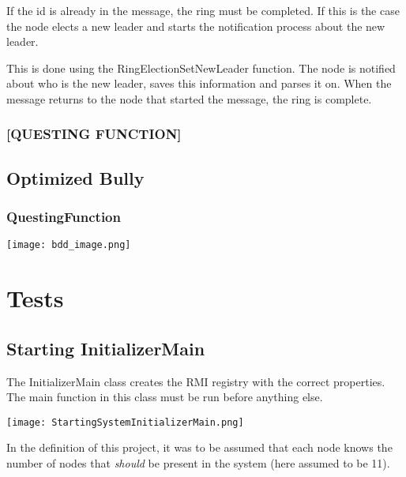 If the id is already in the message, the ring must be completed. If this is the case the node elects a new leader and starts the notification process about the new leader.

This is done using the RingElectionSetNewLeader function. The node is notified about who is the new leader, saves this information and parses it on. When the message returns to the node that started the message, the ring is complete.

\begin{center}
\end{center}



\subsubsection{[QUESTING FUNCTION]}
\subsection{Optimized Bully}
\subsubsection{QuestingFunction}




\begin{center}
	\texttt{[image: bdd\_image.png]}
\end{center}
\section{Tests}
\subsection{Starting InitializerMain}
The InitializerMain class creates the RMI registry with the correct properties. The main function in this class must be run before anything else. 

\begin{center}
	\texttt{[image: StartingSystemInitializerMain.png]}
\end{center}

In the definition of this project, it was to be assumed that each node knows the number of nodes that \textit{should} be present in the system (here assumed to be 11).

